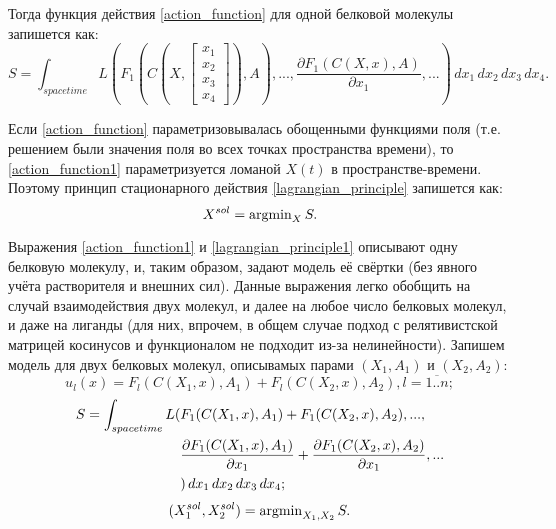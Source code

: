 Тогда функция действия \ref{action_function} для одной белковой молекулы запишется как:
\begin{equation}
	S = \int_{spacetime}L(F_1(C(X, \begin{bmatrix} x_1 \\ x_2 \\ x_3 \\ x_4 \end{bmatrix}), A), ...,\frac{\partial{F_1(C(X, x), A)}}{\partial{x_1}}, ...) \, dx_1 \, dx_2 \, dx_3 \, dx_4.
	\label{action_function1}
\end{equation}

Если \ref{action_function} параметризовывалась обощенными функциями поля (т.е. решением \label{lagrangian_principle} были значения поля во всех точках пространства времени), то
\ref{action_function1} параметризуется ломаной $X(t)$ в пространстве-времени. Поэтому принцип стационарного действия \ref{lagrangian_principle} запишется как:
\begin{equation}
	X^{sol} = \operatorname{argmin}_{X}S.
	\label{lagrangian_principle1}
\end{equation}

Выражения \ref{action_function1} и \ref{lagrangian_principle1} описывают одну белковую молекулу, и, таким образом, задают модель её свёртки (без явного учёта растворителя и внешних сил).
Данные выражения легко обобщить на случай взаимодействия двух молекул, и далее на любое число белковых молекул, и даже на лиганды (для них, впрочем, в общем случае подход с релятивистской
матрицей косинусов и функционалом не подходит из-за нелинейности). Запишем модель для двух белковых молекул, описывамых парами $(X_1, A_1)$ и $(X_2, A_2)$:
\begin{equation}
	u_l(x) = F_l(C(X_1, x), A_1) + F_l(C(X_2, x), A_2), l=\overline{1..n};
	\label{generalized_variables2}
\end{equation}
\begin{align}
	S = \int_{spacetime}L(&F_1(C(X_1, x), A_1) + F_1(C(X_2, x), A_2), ...,\notag \\
						    &\frac{\partial{F_1(C(X_1, x), A_1)}}{\partial{x_1}} + \frac{\partial{F_1(C(X_2, x), A_2)}}{\partial{x_1}}, ... \notag \\
						    &) \, dx_1 \, dx_2 \, dx_3 \, dx_4;
	\label{action_function2}
\end{align}
\begin{equation}
	(X^{sol}_1, X^{sol}_2) = \operatorname{argmin}_{X_1, X_2}S.
	\label{lagrangian_principle2}
\end{equation}

